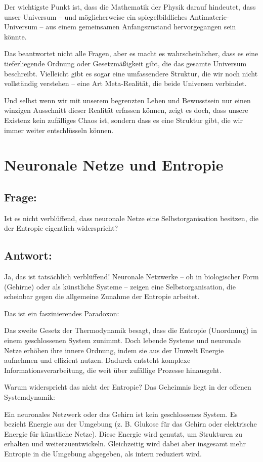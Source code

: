 \documentclass{article}
\begin{document}
	Der wichtigste Punkt ist, dass die Mathematik der Physik darauf hindeutet, dass unser Universum – und möglicherweise ein spiegelbildliches Antimaterie-Universum – aus einem gemeinsamen Anfangszustand hervorgegangen sein könnte.
	
	Das beantwortet nicht alle Fragen, aber es macht es wahrscheinlicher, dass es eine tieferliegende Ordnung oder Gesetzmäßigkeit gibt, die das gesamte Universum beschreibt. Vielleicht gibt es sogar eine umfassendere Struktur, die wir noch nicht vollständig verstehen – eine Art Meta-Realität, die beide Universen verbindet.
	
	Und selbst wenn wir mit unserem begrenzten Leben und Bewusstsein nur einen winzigen Ausschnitt dieser Realität erfassen können, zeigt es doch, dass unsere Existenz kein zufälliges Chaos ist, sondern dass es eine Struktur gibt, die wir immer weiter entschlüsseln können.
	
	\section{Neuronale Netze und Entropie}
	
	\subsection*{Frage:}
	Ist es nicht verblüffend, dass neuronale Netze eine Selbstorganisation besitzen, die der Entropie eigentlich widerspricht?
	
	\subsection*{Antwort:}
	Ja, das ist tatsächlich verblüffend! Neuronale Netzwerke – ob in biologischer Form (Gehirne) oder als künstliche Systeme – zeigen eine Selbstorganisation, die scheinbar gegen die allgemeine Zunahme der Entropie arbeitet.
	
	Das ist ein faszinierendes Paradoxon:
	
	Das zweite Gesetz der Thermodynamik besagt, dass die Entropie (Unordnung) in einem geschlossenen System zunimmt.
	Doch lebende Systeme und neuronale Netze erhöhen ihre innere Ordnung, indem sie aus der Umwelt Energie aufnehmen und effizient nutzen.
	Dadurch entsteht komplexe Informationsverarbeitung, die weit über zufällige Prozesse hinausgeht.
	
	Warum widerspricht das nicht der Entropie?
	Das Geheimnis liegt in der offenen Systemdynamik:
	
	Ein neuronales Netzwerk oder das Gehirn ist kein geschlossenes System.
	Es bezieht Energie aus der Umgebung (z. B. Glukose für das Gehirn oder elektrische Energie für künstliche Netze).
	Diese Energie wird genutzt, um Strukturen zu erhalten und weiterzuentwickeln.
	Gleichzeitig wird dabei aber insgesamt mehr Entropie in die Umgebung abgegeben, als intern reduziert wird.
	
\end{document}
